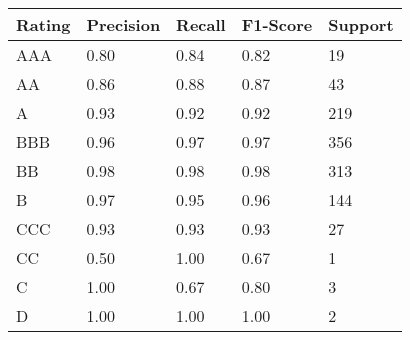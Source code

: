 \small
\begin{tabular}{x{0.75cm}|x{0.75cm}|x{0.75cm}|x{0.75cm}|x{0.75cm}}
\toprule
Rating & Precision & Recall & F1-Score & Support \\
\midrule
AAA & 0.80 & 0.84 & 0.82 & 19 \\
AA & 0.86 & 0.88 & 0.87 & 43 \\
A & 0.93 & 0.92 & 0.92 & 219 \\
BBB & 0.96 & 0.97 & 0.97 & 356 \\
BB & 0.98 & 0.98 & 0.98 & 313 \\
B & 0.97 & 0.95 & 0.96 & 144 \\
CCC & 0.93 & 0.93 & 0.93 & 27 \\
CC & 0.50 & 1.00 & 0.67 & 1 \\
C & 1.00 & 0.67 & 0.80 & 3 \\
D & 1.00 & 1.00 & 1.00 & 2 \\
\bottomrule
\end{tabular}

\normalsize